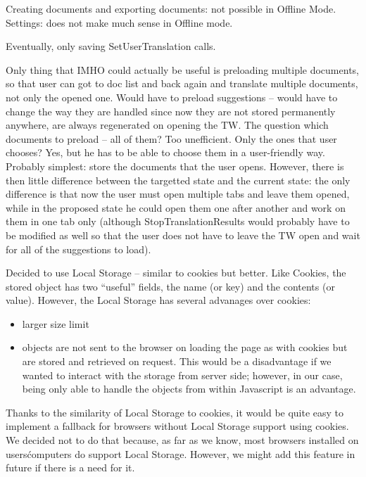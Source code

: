 Creating documents and exporting documents: not possible in Offline Mode.
Settings: does not make much sense in Offline mode.

Eventually, only saving SetUserTranslation calls.

Only thing that IMHO could actually be useful is preloading multiple documents, so that user can got to doc list and back again and translate multiple documents, not only the opened one.
Would have to preload suggestions -- would have to change the way they are handled since now they are not stored permanently anywhere, are always regenerated on opening the TW.
The question which documents to preload -- all of them? Too unefficient. Only the ones that user chooses? Yes, but he has to be able to choose them in a user-friendly way. Probably simplest: store the documents that the user opens. However, there is then little difference between the targetted state and the current state: the only difference is that now the user must open multiple tabs and leave them opened, while in the proposed state he could open them one after another and work on them in one tab only (although StopTranslationResults would probably have to be modified as well so that the user does not have to leave the TW open and wait for all of the suggestions to load). 

Decided to use Local Storage -- similar to cookies but better.
Like Cookies, the stored object has two ``useful'' fields, the name (or key) and the contents (or value). However, the Local Storage has several advanages over cookies:

\begin{itemize}
\item larger size limit
\item objects are not sent to the browser on loading the page as with cookies but are stored and retrieved on request. This would be a disadvantage if we wanted to interact with the storage from server side; however, in our case, being only able to handle the objects from within Javascript is an advantage.
\end{itemize}

Thanks to the similarity of Local Storage to cookies, it would be quite easy to implement a fallback for browsers without Local Storage support using cookies. We decided not to do that because, as far as we know, most browsers installed on users\' computers do support Local Storage. However, we might add this feature in future if there is a need for it.

